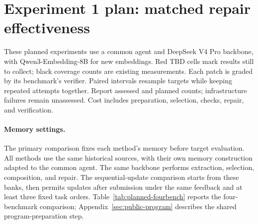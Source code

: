 \begingroup
\raggedbottom
\expcolor
\makeatletter
\renewenvironment{table}[1][]{%
  \par\addvspace{\intextsep}\noindent
  \begin{minipage}{\linewidth}\def\@captype{table}%
}{%
  \end{minipage}\par\addvspace{\intextsep}%
}
\makeatother

\section{Experiment 1 plan: matched repair effectiveness}
\label{sec:planned-outcomes}
These planned experiments use a common agent and DeepSeek V4 Pro backbone,
with Qwen3-Embedding-8B for new embeddings. Red TBD cells mark results still
to collect; black coverage counts are existing measurements. Each patch is
graded by its benchmark's verifier. Paired intervals resample targets while
keeping repeated attempts together. Report assessed and planned counts;
infrastructure failures remain unassessed. Cost includes preparation,
selection, checks, repair, and verification.

\paragraph{Memory settings.}
The primary comparison fixes each method's memory before target evaluation.
All methods use the same historical sources, with their own memory construction
adapted to the common agent. The same backbone performs extraction, selection,
composition, and repair. The sequential-update comparison starts from these
banks, then permits updates after submission under the same feedback and
at least three fixed task orders. Table~\ref{tab:planned-fourbench} reports
the four-benchmark comparison; Appendix~\ref{sec:public-program} describes
the shared program-preparation step.

